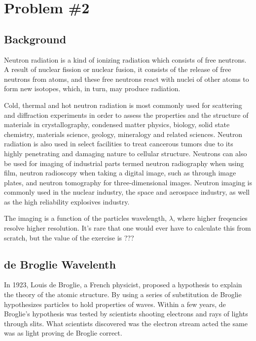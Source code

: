 \documentclass{article}
\begin{document}
\section{Problem \#2}

\subsection{Background}
Neutron radiation is a kind of ionizing radiation which consists of free neutrons. A result of nuclear fission or nuclear fusion, it consists of the release of free neutrons from atoms, and these free neutrons react with nuclei of other atoms to form new isotopes, which, in turn, may produce radiation.

Cold, thermal and hot neutron radiation is most commonly used for scattering and diffraction experiments in order to assess the properties and the structure of materials in crystallography, condensed matter physics, biology, solid state chemistry, materials science, geology, mineralogy and related sciences. Neutron radiation is also used in select facilities to treat cancerous tumors due to its highly penetrating and damaging nature to cellular structure. Neutrons can also be used for imaging of industrial parts termed neutron radiography when using film, neutron radioscopy when taking a digital image, such as through image plates, and neutron tomography for three-dimensional images. Neutron imaging is commonly used in the nuclear industry, the space and aerospace industry, as well as the high reliability explosives industry.

The imaging is a function of the particles wavelength, $\lambda$, where higher freqencies resolve higher resolution. It's rare that one would ever have to calculate this from scratch, but the value of the exercise is ??? 

\subsection{de Broglie Wavelenth}

In 1923, Louis de Broglie, a French physicist, proposed a hypothesis to explain the theory of the atomic structure. By using a series of substitution de Broglie hypothesizes particles to hold properties of waves. Within a few years, de Broglie's hypothesis was tested by scientists shooting electrons and rays of lights through slits. What scientists discovered was the electron stream acted the same was as light proving de Broglie correct.
\end{document}

